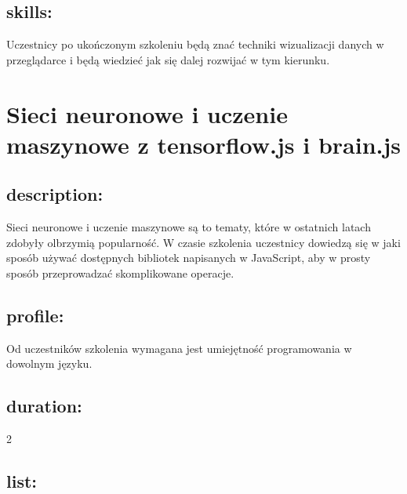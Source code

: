\documentclass{article}[10pt]
\begin{document}
	\subsection*{skills:}
\begin{adjustwidth}{2cm}{}
	
Uczestnicy po ukończonym szkoleniu będą znać techniki wizualizacji danych w przeglądarce i będą wiedzieć jak się dalej rozwijać w tym kierunku.


\end{adjustwidth}

\newpage


    
	\section{Sieci neuronowe i uczenie maszynowe z tensorflow.js i brain.js}

	\subsection*{description:}
	\begin{adjustwidth}{2cm}{}
		Sieci neuronowe i uczenie maszynowe są to tematy, które w ostatnich latach zdobyły olbrzymią popularność. W czasie szkolenia uczestnicy dowiedzą się w jaki sposób używać dostępnych bibliotek napisanych w JavaScript, aby w prosty sposób przeprowadzać skomplikowane operacje.


	\end{adjustwidth}
	\subsection*{profile:}
\begin{adjustwidth}{2cm}{}
	
Od uczestników szkolenia wymagana jest umiejętność programowania w dowolnym języku.

\end{adjustwidth}
	\subsection*{duration:}
\begin{adjustwidth}{2cm}{}
	2
\end{adjustwidth}

	\subsection*{list:}
\begin{adjustwidth}{1.5cm}{}
	\begin{itemize}









	\end{itemize}
\end{adjustwidth}
\end{document}
